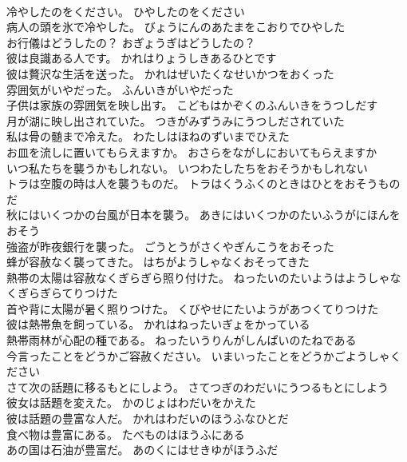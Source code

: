 \documentclass[8pt]{extreport}
\begin{document}
\begin{CJK}{UTF8}{min}
\\	冷やしたのをください。	ひやしたのをください 
\\	病人の頭を氷で冷やした。	びょうにんのあたまをこおりでひやした 
\\	お行儀はどうしたの？	おぎょうぎはどうしたの？ 
\\	彼は良識ある人です。	かれはりょうしきあるひとです 
\\	彼は贅沢な生活を送った。	かれはぜいたくなせいかつをおくった 
\\	雰囲気がいやだった。	ふんいきがいやだった 
\\	子供は家族の雰囲気を映し出す。	こどもはかぞくのふんいきをうつしだす 
\\	月が湖に映し出されていた。	つきがみずうみにうつしだされていた 
\\	私は骨の髄まで冷えた。	わたしはほねのずいまでひえた 
\\	お皿を流しに置いてもらえますか。	おさらをながしにおいてもらえますか 
\\	いつ私たちを襲うかもしれない。	いつわたしたちをおそうかもしれない 
\\	トラは空腹の時は人を襲うものだ。	トラはくうふくのときはひとをおそうものだ 
\\	秋にはいくつかの台風が日本を襲う。	あきにはいくつかのたいふうがにほんをおそう 
\\	強盗が昨夜銀行を襲った。	ごうとうがさくやぎんこうをおそった 
\\	蜂が容赦なく襲ってきた。	はちがようしゃなくおそってきた 
\\	熱帯の太陽は容赦なくぎらぎら照り付けた。	ねったいのたいようはようしゃなくぎらぎらてりつけた 
\\	首や背に太陽が暑く照りつけた。	くびやせにたいようがあつくてりつけた 
\\	彼は熱帯魚を飼っている。	かれはねったいぎょをかっている 
\\	熱帯雨林が心配の種である。	ねったいうりんがしんぱいのたねである 
\\	今言ったことをどうかご容赦ください。	いまいったことをどうかごようしゃください 
\\	さて次の話題に移るもとにしよう。	さてつぎのわだいにうつるもとにしよう 
\\	彼女は話題を変えた。	かのじょはわだいをかえた 
\\	彼は話題の豊富な人だ。	かれはわだいのほうふなひとだ 
\\	食べ物は豊富にある。	たべものはほうふにある 
\\	あの国は石油が豊富だ。	あのくにはせきゆがほうふだ 

\end{CJK}
\end{document}
